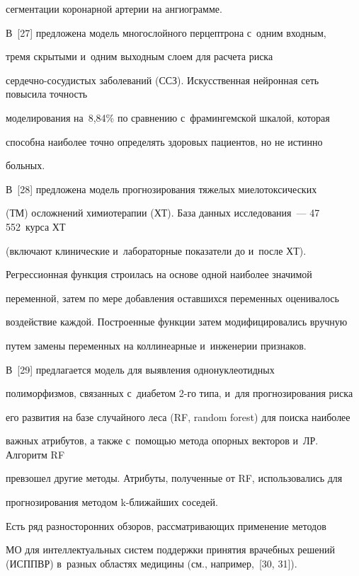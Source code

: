 сегментации коронарной артерии на ангиограмме. 

  

  В~[27] предложена модель многослойного перцептрона с~одним входным, 

тремя скрытыми и~одним выходным слоем для расчета риска  

сер\-деч\-но-со\-су\-дис\-тых заболеваний (ССЗ). Искусственная нейронная сеть повысила точ\-ность 

моделирования на~8,84\% по сравнению с~фрамингемской шкалой, которая 

способна наиболее точно определять здоровых пациентов, но не истинно 

больных.

{



}

  

  В~[28] предложена модель прогнозирования тяжелых миелотоксических 

(ТМ) осложнений химиотерапии (ХТ). База данных исследования~--- 47\,552~курса ХТ 

(включают клинические и~лабораторные показатели до и~после ХТ). 

Регрессионная функция строилась на основе одной наиболее значимой 

переменной, затем по мере добавления оставшихся переменных оценивалось 

воздействие каждой. Построенные функции затем модифицировались вручную 

путем замены переменных на коллинеарные и~инженерии признаков. 

  

  В~[29] предлагается модель для выявления однонуклеотидных 

полиморфизмов, связанных с~диабетом 2-го типа, и~для прогнозирования риска 

его развития на базе случайного леса (RF, random forest) для поиска наиболее 

важных атрибутов, а также с~помощью метода опорных векторов и~ЛР. Алгоритм RF 

превзошел другие методы. Атрибуты, полученные от RF, использовались для 

прогнозирования методом k-бли\-жай\-ших соседей. 

  

  Есть ряд разносторонних обзоров, рассматривающих применение методов 

МО для интеллектуальных систем поддержки принятия врачебных решений (ИСППВР) в~разных областях медицины (см., например,~[30, 31]).



